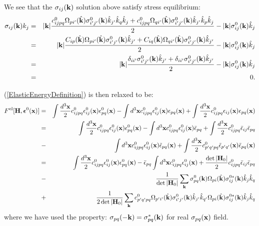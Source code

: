 \documentclass[12pt]{article}
\def\bmath#1{\mbox{\boldmath$#1$}}
\begin{document}
We see that the $\sigma_{ij}({\bf k})$ solution above satisfy stress
equilibrium:
\begin{eqnarray}
 \sigma_{ij}({\bf k}) k_j 
=&& 
|{\bf k}|\frac{c_{ijpq}^0\Omega_{pi'}(\hat{\bf k})\sigma^0_{i'j'}({\bf k}) 
\hat{k}_{j'} \hat{k}_q \hat{k}_j + 
      c_{ijpq}^0\Omega_{qi'}(\hat{\bf k})\sigma^0_{i'j'}({\bf k}) 
\hat{k}_{j'} \hat{k}_p \hat{k}_j}
 {2}
- |{\bf k}|\sigma^0_{ij}({\bf k})\hat{k}_j \nonumber\\
=&& 
|{\bf k}|\frac{C_{ip}(\hat{\bf k})\Omega_{pi'}(\hat{\bf k})\sigma^0_{i'j'}({\bf k}) 
\hat{k}_{j'} + 
      C_{iq}(\hat{\bf k})\Omega_{qi'}(\hat{\bf k})\sigma^0_{i'j'}({\bf k}) 
\hat{k}_{j'} }
 {2}
- |{\bf k}|\sigma^0_{ij}({\bf k})\hat{k}_j\nonumber\\
=&& 
|{\bf k}|\frac{\delta_{ii'}\sigma^0_{i'j'}({\bf k}) 
\hat{k}_{j'} + 
      \delta_{ii'}\sigma^0_{i'j'}({\bf k}) 
\hat{k}_{j'} }
 {2}
- |{\bf k}|\sigma^0_{ij}({\bf k})\hat{k}_j\nonumber\\
=&& 0.
\end{eqnarray}

(\ref{ElasticEnergyDefinition}) is then relaxed to be:
\begin{eqnarray}
F^{\rm el}[{\bf H}, \bmath{\epsilon}^0({\bf x})] =&& 
 \int \frac{d^3{\bf x}}{2} c^0_{ijpq}
 \epsilon^0_{ij}({\bf x})  
 \epsilon^0_{pq}({\bf x}) - 
\int d^3{\bf x} c^0_{ijpq} \epsilon^0_{ij}({\bf x}) {\epsilon}_{pq}({\bf x})
+ 
\int \frac{d^3{\bf x}}{2} c^0_{ijpq} 
{\epsilon}_{ij}({\bf x}){\epsilon}_{pq}({\bf x})
 \nonumber\\
=&& 
 \int \frac{d^3{\bf x}}{2} c^0_{ijpq}
 \epsilon^0_{ij}({\bf x})  
 \epsilon^0_{pq}({\bf x}) - 
\int d^3{\bf x} c^0_{ijpq} \epsilon^0_{ij}({\bf x}) \bar{\epsilon}_{pq}
+ 
\int \frac{d^3{\bf x}}{2} c^0_{ijpq} \bar{\epsilon}_{ij} \bar{\epsilon}_{pq}
 \nonumber\\
-&& \int d^3{\bf x} c^0_{ijpq} \epsilon^0_{ij}({\bf x})
  \tilde{\epsilon}_{pq}({\bf x}) + 
\int \frac{d^3{\bf x}}{2} c^0_{p'q'pq} \tilde{\epsilon}_{p'q'}({\bf x}) 
\tilde{\epsilon}_{pq}({\bf x}) 
\nonumber\\
=&& 
 \int \frac{d^3{\bf x}}{2} c^0_{ijpq}
 \epsilon^0_{ij}({\bf x})  
 \epsilon^0_{pq}({\bf x}) - 
\bar{\epsilon}_{pq}\int d^3{\bf x} c^0_{ijpq} \epsilon^0_{ij}({\bf x}) 
+ 
\frac{\det|{\bf H}_0|}{2} c^0_{ijpq} \bar{\epsilon}_{ij} \bar{\epsilon}_{pq}
 \nonumber\\
-&& \frac{1}{\det|{\bf H}_0|}\sum_{\bf k}
\sigma^0_{pq}({\bf k})
\Omega_{pi}(\hat{\bf k})\sigma^{0*}_{ij}({\bf k}) \hat{k}_j \hat{k}_q
 \nonumber\\
 +&&
\frac{1}{2\det|{\bf H}_0|}\sum_{\bf k}
c^0_{p'q'pq} 
\Omega_{p'i'}(\hat{\bf k})\sigma^0_{i'j'}({\bf k}) \hat{k}_{j'} \hat{k}_{q'} 
\Omega_{pi}(\hat{\bf k})\sigma^{0*}_{ij}({\bf k}) \hat{k}_j \hat{k}_q 
\end{eqnarray}
where we have used the property: $\sigma_{pq}(-{\bf
k})=\sigma_{pq}^*({\bf k})$ for real $\sigma_{pq}({\bf x})$ field.
\end{document}
